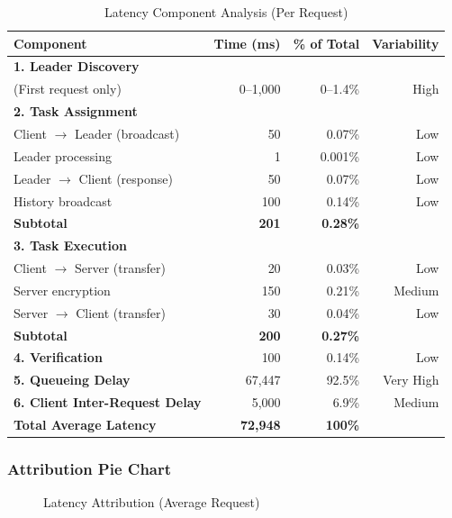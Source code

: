 \documentclass[12pt,a4paper]{article}
\begin{document}
\begin{table}[h]
\centering
\caption{Latency Component Analysis (Per Request)}
\label{tab:latency-breakdown}
\begin{tabular}{@{}lrrr@{}}
\toprule
\textbf{Component} & \textbf{Time (ms)} & \textbf{\% of Total} & \textbf{Variability} \\
\midrule
\textbf{1. Leader Discovery} & & & \\
\quad (First request only) & 0--1,000 & 0--1.4\% & High \\
\midrule
\textbf{2. Task Assignment} & & & \\
\quad Client $\to$ Leader (broadcast) & 50 & 0.07\% & Low \\
\quad Leader processing & 1 & 0.001\% & Low \\
\quad Leader $\to$ Client (response) & 50 & 0.07\% & Low \\
\quad History broadcast & 100 & 0.14\% & Low \\
\quad \textbf{Subtotal} & \textbf{201} & \textbf{0.28\%} & \\
\midrule
\textbf{3. Task Execution} & & & \\
\quad Client $\to$ Server (transfer) & 20 & 0.03\% & Low \\
\quad Server encryption & 150 & 0.21\% & Medium \\
\quad Server $\to$ Client (transfer) & 30 & 0.04\% & Low \\
\quad \textbf{Subtotal} & \textbf{200} & \textbf{0.27\%} & \\
\midrule
\textbf{4. Verification} & 100 & 0.14\% & Low \\
\midrule
\textbf{5. Queueing Delay} & 67,447 & 92.5\% & Very High \\
\midrule
\textbf{6. Client Inter-Request Delay} & 5,000 & 6.9\% & Medium \\
\midrule
\textbf{Total Average Latency} & \textbf{72,948} & \textbf{100\%} & \\
\bottomrule
\end{tabular}
\end{table}

\subsubsection{Attribution Pie Chart}

\begin{figure}[h]
\centering
{}
\caption{Latency Attribution (Average Request)}
\label{fig:latency-pie}
\end{figure}
\end{document}
